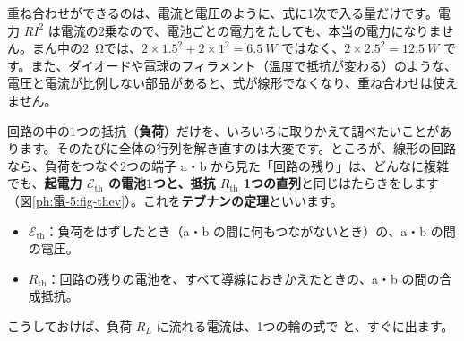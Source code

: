 \begin{seikaku}
重ね合わせができるのは、電流と電圧のように、式に1次で入る量だけです。電力 $RI^2$ は電流の2乗なので、電池ごとの電力をたしても、本当の電力になりません。まん中の\qty{2}{\ohm}では、$2\times1.5^2+2\times1^2=\qty{6.5}{W}$ ではなく、$2\times2.5^2=\qty{12.5}{W}$ です。また、ダイオードや電球のフィラメント（温度で抵抗が変わる）のような、電圧と電流が比例しない部品があると、式が線形でなくなり、重ね合わせは使えません。
\end{seikaku}


\leavevmode\label{ph:電-5:sec6}回路の中の1つの抵抗（\textbf{負荷}）だけを、いろいろに取りかえて調べたいことがあります。そのたびに全体の行列を解き直すのは大変です。ところが、線形の回路なら、負荷をつなぐ2つの端子 a・b から見た「回路の残り」は、どんなに複雑でも、\textbf{起電力 $\mathcal E_{\mathrm{th}}$ の電池1つと、抵抗 $R_{\mathrm{th}}$ 1つの直列}と同じはたらきをします（図\ref{ph:電-5:fig-thev}）。これを\textbf{テブナンの定理}といいます。
\begin{itemize}[leftmargin=1.2\zw, itemsep=2pt, topsep=2pt, label={\color{bkTheme}●}]
\item $\mathcal E_{\mathrm{th}}$：負荷をはずしたとき（a・b の間に何もつながないとき）の、a・b の間の電圧。
\item $R_{\mathrm{th}}$：回路の残りの電池を、すべて導線におきかえたときの、a・b の間の合成抵抗。
\end{itemize}
こうしておけば、負荷 $R_L$ に流れる電流は、1つの輪の式で
\label{ph:電-5:thev}と、すぐに出ます。

